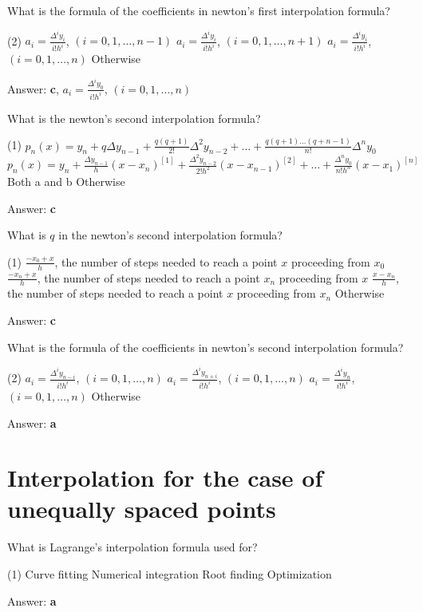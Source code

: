 \documentclass{exam}
\begin{document}
\begin{questions}
	\question What is the formula of the coefficients in newton's first interpolation formula?
	\begin{tasks}(2)
		\task $a_i = \frac{\Delta^i y_i}{i!h^i}$, $(i = 0, 1, \dots, n - 1)$
		\task $a_i = \frac{\Delta^i y_i}{i!h^i}$, $(i = 0, 1, \dots, n + 1)$
		\task $a_i = \frac{\Delta^i y_i}{i!h^i}$, $(i = 0, 1, \dots, n)$
		\task Otherwise
	\end{tasks}
	Answer: \textbf{c}, $a_i = \frac{\Delta^i y_0}{i!h^i}$, $(i = 0, 1, \dots, n)$

	\question What is the newton's second interpolation formula?
	\begin{tasks}(1)
		\task $p_n(x) = y_n + q \Delta y_{n-1} + \frac{q(q+1)}{2!} \Delta^2 y_{n-2} + \dots + \frac{q(q+1)\dots(q+n-1)}{n!} \Delta^n y_0$
		\task $p_n(x) = y_n + \frac{\Delta y_{n-1}}{h}(x-x_n)^{[1]} + \frac{\Delta^2 y_{n-2}}{2!h^2}(x-x_{n-1})^{[2]} + \dots + \frac{\Delta^n y_0}{n!h^n}(x-x_1)^{[n]}$
		\task Both a and b
		\task Otherwise
	\end{tasks}
	Answer: \textbf{c}

	\question What is $q$ in the newton's second interpolation formula?
	\begin{tasks}(1)
		\task $\frac{-x_0+x}{h}$, the number of steps needed to reach a point $x$ proceeding from $x_0$
		\task $\frac{-x_n+x}{h}$, the number of steps needed to reach a point $x_n$ proceeding from $x$
		\task $\frac{x-x_n}{h}$, the number of steps needed to reach a point $x$ proceeding from $x_n$
		\task Otherwise
	\end{tasks}
	Answer: \textbf{c}

	\question What is the formula of the coefficients in newton's second interpolation formula?
	\begin{tasks}(2)
		\task $a_i = \frac{\Delta^i y_{n-i}}{i!h^i}$, $(i = 0, 1, \dots, n)$
		\task $a_i = \frac{\Delta^i y_{n+i}}{i!h^i}$, $(i = 0, 1, \dots, n)$
		\task $a_i = \frac{\Delta^i y_n}{i!h^i}$, $(i = 0, 1, \dots, n)$
		\task Otherwise
	\end{tasks}
	Answer: \textbf{a}

	\section{Interpolation for the case of unequally spaced points}

	\question What is Lagrange's interpolation formula used for?
	\begin{tasks}(1)
		\task Curve fitting
		\task Numerical integration
		\task Root finding
		\task Optimization
	\end{tasks}
	Answer: \textbf{a}


\end{questions}
\end{document}
